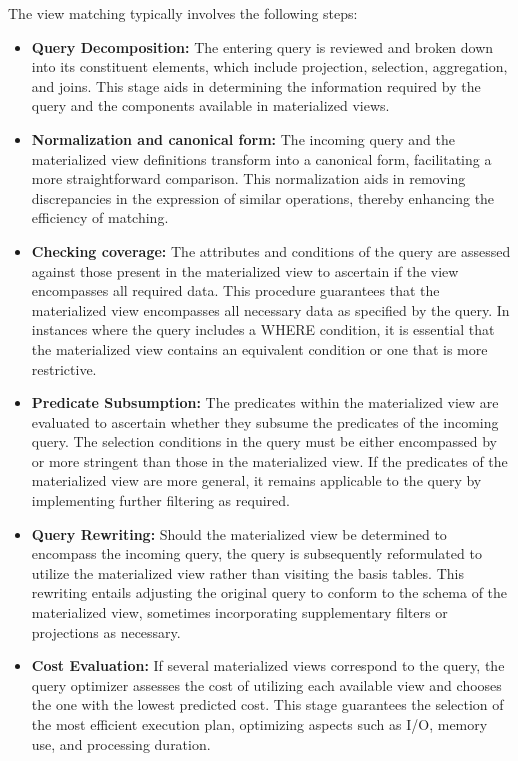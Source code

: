  The view matching typically involves the following steps:
  \begin{itemize}
      \item \textbf{Query Decomposition:} The entering query is reviewed and broken down into its constituent elements, which include projection, selection, aggregation, and joins. This stage aids in determining the information required by the query and the components available in materialized views.

      \item \textbf{Normalization and canonical form:} The incoming query and the materialized view definitions transform into a canonical form, facilitating a more straightforward comparison.
This normalization aids in removing discrepancies in the expression of similar operations, thereby enhancing the efficiency of matching.

     \item \textbf{Checking coverage:} The attributes and conditions of the query are assessed against those present in the materialized view to ascertain if the view encompasses all required data. This procedure guarantees that the materialized view encompasses all necessary data as specified by the query. In instances where the query includes a WHERE condition, it is essential that the materialized view contains an equivalent condition or one that is more restrictive.
     
      \item \textbf{Predicate Subsumption:} The predicates within the materialized view are evaluated to ascertain whether they subsume the predicates of the incoming query.
The selection conditions in the query must be either encompassed by or more stringent than those in the materialized view. If the predicates of the materialized view are more general, it remains applicable to the query by implementing further filtering as required.

      \item \textbf{Query Rewriting:} Should the materialized view be determined to encompass the incoming query, the query is subsequently reformulated to utilize the materialized view rather than visiting the basis tables.
This rewriting entails adjusting the original query to conform to the schema of the materialized view, sometimes incorporating supplementary filters or projections as necessary.

         \item \textbf{Cost Evaluation:} If several materialized views correspond to the query, the query optimizer assesses the cost of utilizing each available view and chooses the one with the lowest predicted cost.
This stage guarantees the selection of the most efficient execution plan, optimizing aspects such as I/O, memory use, and processing duration.

  \end{itemize}


